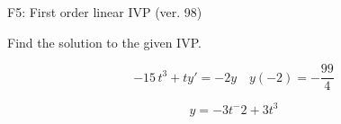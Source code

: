 \begin{exercise}
  \begin{exerciseTitle}F5: First order linear IVP (ver. 98)\end{exerciseTitle}
  \begin{exerciseStatement}
    
Find the solution to the given IVP.

    
\[-15 \, t^{3} +ty'= -2 y \hspace{1em} y( -2 ) = -\frac{99}{4}\]

  \end{exerciseStatement}
  \begin{exerciseAnswer}
    
\[y= -3 t^ -2 +3 t^{3}\]

  \end{exerciseAnswer}
\end{exercise}